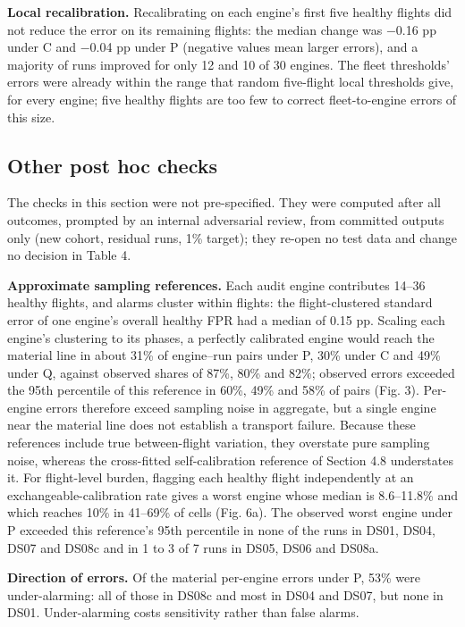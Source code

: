 \documentclass[preprint,11pt,a4paper]{elsarticle}
\begin{document}
\textbf{Local recalibration.} Recalibrating on each engine's first five healthy flights did not reduce the error on its remaining flights: the median change was −0.16 pp under C and −0.04 pp under P (negative values mean larger errors), and a majority of runs improved for only 12 and 10 of 30 engines. The fleet thresholds' errors were already within the range that random five-flight local thresholds give, for every engine; five healthy flights are too few to correct fleet-to-engine errors of this size.

\subsection{Other post hoc checks}

The checks in this section were not pre-specified. They were computed after all outcomes, prompted by an internal adversarial review, from committed outputs only (new cohort, residual runs, 1\% target); they re-open no test data and change no decision in Table 4.

\textbf{Approximate sampling references.} Each audit engine contributes 14–36 healthy flights, and alarms cluster within flights: the flight-clustered standard error of one engine's overall healthy FPR had a median of 0.15 pp. Scaling each engine's clustering to its phases, a perfectly calibrated engine would reach the material line in about 31\% of engine–run pairs under P, 30\% under C and 49\% under Q, against observed shares of 87\%, 80\% and 82\%; observed errors exceeded the 95th percentile of this reference in 60\%, 49\% and 58\% of pairs (Fig. 3). Per-engine errors therefore exceed sampling noise in aggregate, but a single engine near the material line does not establish a transport failure. Because these references include true between-flight variation, they overstate pure sampling noise, whereas the cross-fitted self-calibration reference of Section 4.8 understates it. For flight-level burden, flagging each healthy flight independently at an exchangeable-calibration rate gives a worst engine whose median is 8.6–11.8\% and which reaches 10\% in 41–69\% of cells (Fig. 6a). The observed worst engine under P exceeded this reference's 95th percentile in none of the runs in DS01, DS04, DS07 and DS08c and in 1 to 3 of 7 runs in DS05, DS06 and DS08a.

\textbf{Direction of errors.} Of the material per-engine errors under P, 53\% were under-alarming: all of those in DS08c and most in DS04 and DS07, but none in DS01. Under-alarming costs sensitivity rather than false alarms.
\end{document}
